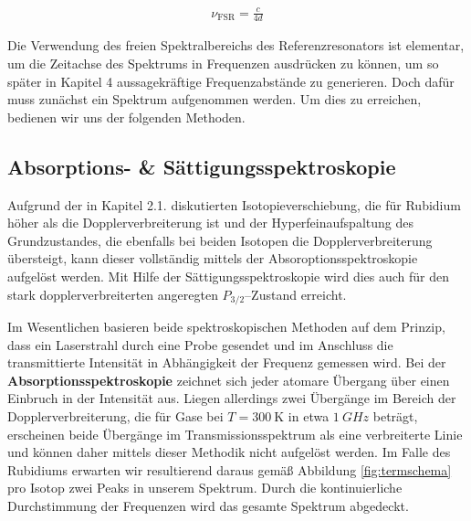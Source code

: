 \begin{align}
    \nu_{\text{FSR}}=\frac{c}{4d} \label{eq:freier Spektral Bereich}
\end{align}

\noindent Die Verwendung des freien Spektralbereichs des Referenzresonators ist elementar, um die Zeitachse des Spektrums in Frequenzen ausdrücken zu können, um so später in Kapitel 4 aussagekräftige Frequenzabstände zu generieren. Doch dafür muss zunächst ein Spektrum aufgenommen werden. Um dies zu erreichen, bedienen wir uns der folgenden Methoden.

\subsection{Absorptions- \& Sättigungsspektroskopie}

\noindent Aufgrund der in Kapitel 2.1. diskutierten Isotopieverschiebung, die für Rubidium höher als die Dopplerverbreiterung ist und der Hyperfeinaufspaltung des Grundzustandes, die ebenfalls bei beiden Isotopen die Dopplerverbreiterung übersteigt, kann dieser vollständig mittels der Absoroptionsspektroskopie aufgelöst werden. Mit Hilfe der Sättigungsspektroskopie wird dies auch für den stark dopplerverbreiterten angeregten $P_{3/2}$--Zustand erreicht. 

\noindent Im Wesentlichen basieren beide spektroskopischen Methoden auf dem Prinzip, dass ein Laserstrahl durch eine Probe gesendet und im Anschluss die transmittierte Intensität in Abhängigkeit der Frequenz gemessen wird. Bei der \textbf{Absorptionsspektroskopie} zeichnet sich jeder atomare Übergang über einen Einbruch in der Intensität aus. Liegen allerdings zwei Übergänge im Bereich der Dopplerverbreiterung, die für Gase bei $T=\SI{300}{\kelvin}$ in etwa $\SI{1}{GHz}$ beträgt, erscheinen beide Übergänge im Transmissionsspektrum als eine verbreiterte Linie und können daher mittels dieser Methodik nicht aufgelöst werden. Im Falle des Rubidiums erwarten wir resultierend daraus gemäß Abbildung \ref{fig:termschema} pro Isotop zwei Peaks in unserem Spektrum. Durch die kontinuierliche Durchstimmung der Frequenzen wird das gesamte Spektrum abgedeckt. 

